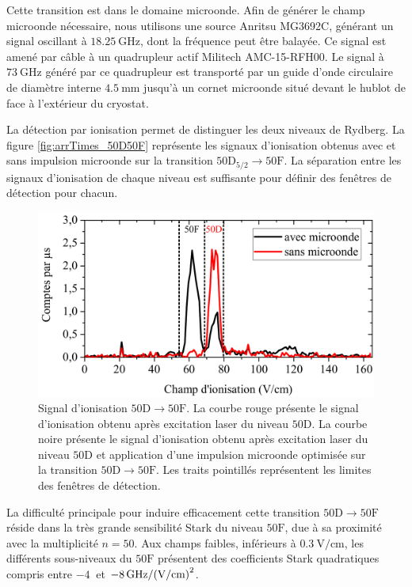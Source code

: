 Cette transition est dans le domaine microonde.
Afin de générer le champ microonde nécessaire, nous utilisons une source Anritsu MG3692C, générant un signal oscillant à $\SI{18.25}{\GHz}$, dont la fréquence peut être balayée.
Ce signal est amené par câble à un quadrupleur actif Militech AMC-15-RFH00.
Le signal à $\SI{73}{\GHz}$ généré par ce quadrupleur est transporté par un guide d'onde circulaire de diamètre interne $\SI{4.5}{\mm}$ jusqu'à un cornet microonde situé devant le hublot de face à l'extérieur du cryostat.

La détection par ionisation permet de distinguer les deux niveaux de Rydberg.
La figure \eqref{fig:arrTimes_50D50F} représente les signaux d'ionisation obtenus avec et sans impulsion microonde sur la transition $\mathrm{50D_{5/2} \rightarrow 50F}$.
La séparation entre les signaux d'ionisation de chaque niveau est suffisante pour définir des fenêtres de détection pour chacun.

\begin{figure}[!h]
\centering
\includegraphics[width=0.85\linewidth]{figures/circulars/arrTimes_50D-50F}
\caption[Signal d'ionisation $\mathrm{50D\rightarrow 50F}$]{
Signal d'ionisation $\mathrm{50D\rightarrow 50F}$.
La courbe rouge présente le signal d'ionisation obtenu après excitation laser du niveau $\mathrm{50D}$.
La courbe noire présente le signal d'ionisation obtenu après excitation laser du niveau $\mathrm{50D}$ et application d'une impulsion microonde optimisée sur la transition $\mathrm{50D \rightarrow 50F}$.
Les traits pointillés représentent les limites des fenêtres de détection.
}
\label{fig:arrTimes_50D50F}
\end{figure}

La difficulté principale pour induire efficacement cette transition $\mathrm{50D} \rightarrow\mathrm{50F}$ réside dans la très grande sensibilité Stark du niveau $\mathrm{50F}$, due à sa proximité avec la multiplicité $n=50$.
Aux champs faibles, inférieurs à $\SI{0.3}{\V/\cm}$, les différents sous-niveaux du $\mathrm{50F}$ présentent des coefficients Stark quadratiques compris entre $\SI {-4}{}$ et $\SI{-8}{\GHz/(\V/\cm)\squared}$.

